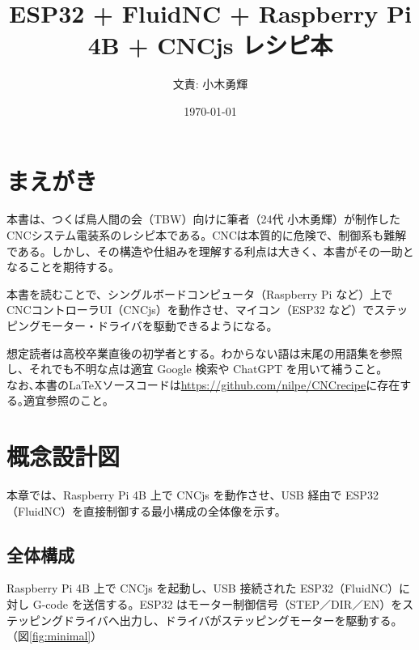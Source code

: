 \documentclass[uplatex,dvipdfmx]{ujarticle}
\begin{document}
\title{ESP32 + FluidNC + Raspberry Pi 4B + CNCjs レシピ本}
\author{文責: 小木勇輝}
\date{\today}
\maketitle

\tableofcontents
\newpage

\section{まえがき}

本書は、つくば鳥人間の会（TBW）向けに筆者（24代 小木勇輝）が制作したCNCシステム電装系のレシピ本である。CNCは本質的に危険で、制御系も難解である。しかし、その構造や仕組みを理解する利点は大きく、本書がその一助となることを期待する。

本書を読むことで、シングルボードコンピュータ（Raspberry Pi など）上でCNCコントローラUI（CNCjs）を動作させ、マイコン（ESP32 など）でステッピングモーター・ドライバを駆動できるようになる。

想定読者は高校卒業直後の初学者とする。わからない語は末尾の用語集を参照し、それでも不明な点は適宜 Google 検索や ChatGPT を用いて補うこと。\\

なお､本書の\LaTeX ソースコードは\url{https://github.com/nilpe/CNCrecipe}に存在する｡適宜参照のこと｡
\section{概念設計図}

本章では、Raspberry Pi 4B 上で CNCjs を動作させ、USB 経由で ESP32（FluidNC）を直接制御する最小構成の全体像を示す。

\subsection{全体構成}

Raspberry Pi 4B 上で CNCjs を起動し、USB 接続された ESP32（FluidNC）に対し G-code を送信する。ESP32 はモーター制御信号（STEP／DIR／EN）をステッピングドライバへ出力し、ドライバがステッピングモーターを駆動する。（図\ref{fig:minimal}）
\end{document}
